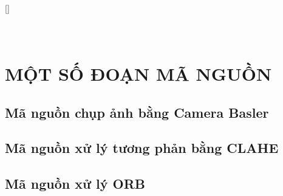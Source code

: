 
[]

\thispagestyle{empty}

\appendix

\chapter[]{\\MỘT SỐ ĐOẠN MÃ NGUỒN} \label{manguon}

\section{Mã nguồn chụp ảnh bằng Camera Basler}
\label{sec:capture}


\section{Mã nguồn xử lý tương phản bằng CLAHE}
\label{sec:clahe}

\VKngatTrang

\section{Mã nguồn xử lý ORB}
\label{sec:orb}

\VKngatTrang
